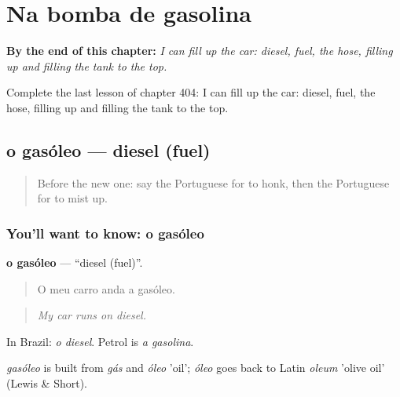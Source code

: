 
\chapter{Na bomba de gasolina}
\label{ch:pt-na-bomba-de-gasolina}

\begin{chapteropening}
\textbf{By the end of this chapter:} \emph{I can fill up the car: diesel, fuel, the hose, filling up and filling the tank to the top.}

Complete the last lesson of chapter 404: I can fill up the car: diesel, fuel, the hose, filling up and filling the tank to the top.
\end{chapteropening}

\section[o gasóleo]{o gasóleo — diesel (fuel)}

\label{lesson:PT-C404-gasoleo}



\begin{quote}
Before the new one: say the Portuguese for to honk, then the Portuguese for to mist up.
\end{quote}

\subsection*{You'll want to know: o gasóleo}
\textbf{o gasóleo} — \textquotedblleft{}diesel (fuel)\textquotedblright{}.

\begin{quote}
O meu carro anda a gasóleo.
\end{quote}

\begin{quote}
\emph{My car runs on diesel.}
\end{quote}

In Brazil: \emph{o diesel}. Petrol is \emph{a gasolina}.

\begin{cousinweb}
\emph{gasóleo} is built from \emph{gás} and \emph{óleo} 'oil'; \emph{óleo} goes back to Latin \emph{oleum} 'olive oil' (Lewis \& Short).
\end{cousinweb}

